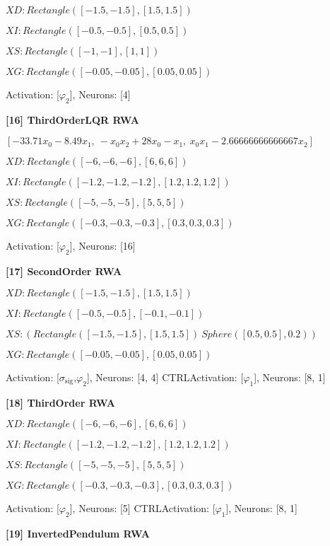  $XD: Rectangle([-1.5, -1.5], [1.5, 1.5]) $

$XI: Rectangle([-0.5, -0.5], [0.5, 0.5]) $

$XS: Rectangle([-1, -1], [1, 1]) $

$XG: Rectangle([-0.05, -0.05], [0.05, 0.05]) $


Activation: [$\varphi_{2}$], Neurons: [4]

\textbf{ [16] ThirdOrderLQR RWA }

$\left[ - 33.71 x_{0} - 8.49 x_{1}, \  - x_{0} x_{2} + 28 x_{0} - x_{1}, \  x_{0} x_{1} - 2.66666666666667 x_{2}\right]$ 
 
 $XD: Rectangle([-6, -6, -6], [6, 6, 6]) $

$XI: Rectangle([-1.2, -1.2, -1.2], [1.2, 1.2, 1.2]) $

$XS: Rectangle([-5, -5, -5], [5, 5, 5]) $

$XG: Rectangle([-0.3, -0.3, -0.3], [0.3, 0.3, 0.3]) $


Activation: [$\varphi_{2}$], Neurons: [16]

\textbf{ [17] SecondOrder RWA }

\left[ - x_{0}^{3} + x_{1}, \  u_{0}\right] 
 
 $XD: Rectangle([-1.5, -1.5], [1.5, 1.5]) $

$XI: Rectangle([-0.5, -0.5], [-0.1, -0.1]) $

$XS: (Rectangle([-1.5, -1.5], [1.5, 1.5]) \ Sphere([0.5, 0.5], 0.2)) $

$XG: Rectangle([-0.05, -0.05], [0.05, 0.05]) $


Activation: [$\sigma_{\mathrm{sig}}$,$\varphi_{2}$], Neurons: [4, 4]
CTRLActivation: [$\varphi_{1}$], Neurons: [8, 1]

\textbf{ [18] ThirdOrder RWA }

\left[ u_{0} - 10 x_{0} + 10 x_{1}, \  - x_{0} x_{2} + 28 x_{0} - x_{1}, \  x_{0} x_{1} - 2.66666666666667 x_{2}\right] 
 
 $XD: Rectangle([-6, -6, -6], [6, 6, 6]) $

$XI: Rectangle([-1.2, -1.2, -1.2], [1.2, 1.2, 1.2]) $

$XS: Rectangle([-5, -5, -5], [5, 5, 5]) $

$XG: Rectangle([-0.3, -0.3, -0.3], [0.3, 0.3, 0.3]) $


Activation: [$\varphi_{2}$], Neurons: [5]
CTRLActivation: [$\varphi_{1}$], Neurons: [8, 1]

\textbf{ [19] InvertedPendulum RWA }

 
